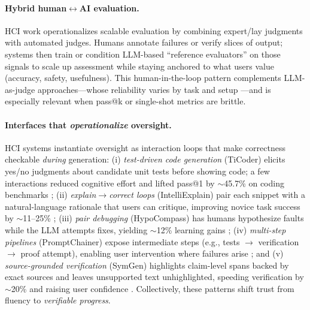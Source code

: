 \documentclass{article}
\begin{document}
\paragraph{Hybrid human$\leftrightarrow$AI evaluation.}
HCI work operationalizes scalable evaluation by combining expert/lay judgments with automated judges. Humans annotate failures or verify slices of output; systems then train or condition LLM-based ``reference evaluators'' on those signals to scale up assessment while staying anchored to what users value (accuracy, safety, usefulness). This human-in-the-loop pattern complements LLM-as-judge approaches---whose reliability varies by task and setup \citep{Kocmi2024HumanVsLLM,Li2024TrustLLMJudgments}---and is especially relevant when pass@k or single-shot metrics are brittle.%

\paragraph{Interfaces that \emph{operationalize} oversight.}
HCI systems instantiate oversight as interaction loops that make correctness checkable \emph{during} generation: (i) \emph{test-driven code generation} (TiCoder) elicits yes/no judgments about candidate unit tests before showing code; a few interactions reduced cognitive effort and lifted pass@1 by $\sim$45.7\% on coding benchmarks \citep{naik2024ticoder}; (ii) \emph{explain$\rightarrow$correct loops} (IntelliExplain) pair each snippet with a natural-language rationale that users can critique, improving novice task success by $\sim$11--25\% \citep{yan2024intelliexplain}; (iii) \emph{pair debugging} (HypoCompass) has humans hypothesize faults while the LLM attempts fixes, yielding $\sim$12\% learning gains \citep{ma2024hypocompass}; (iv) \emph{multi-step pipelines} (PromptChainer) expose intermediate steps (e.g., tests $\rightarrow$ verification $\rightarrow$ proof attempt), enabling user intervention where failures arise \citep{wu2022promptchainer}; and (v) \emph{source-grounded verification} (SymGen) highlights claim-level spans backed by exact sources and leaves unsupported text unhighlighted, speeding verification by $\sim$20\% and raising user confidence \citep{shen2024symgen}. Collectively, these patterns shift trust from fluency to \emph{verifiable progress}.%
\end{document}
